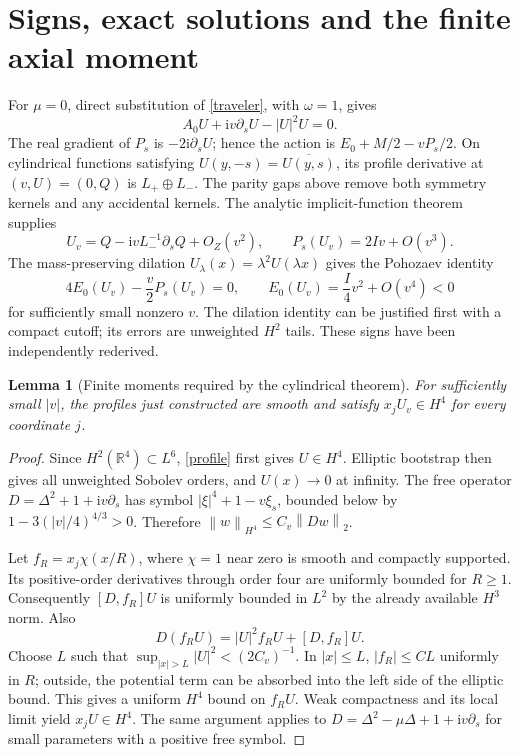 \documentclass[11pt,a4paper]{article}
\newtheorem{lemma}{Lemma}
\newcommand{\R}{\mathbb R}
\newcommand{\ii}{\mathrm i}
\newcommand{\norm}[1]{\left\|#1\right\|}
\begin{document}
\section{Signs, exact solutions and the finite axial moment}
For $\mu=0$, direct substitution of \eqref{traveler}, with $\omega=1$, gives
\begin{equation}\label{profile}
 A_0U+\ii v\partial_sU-|U|^2U=0.
\end{equation}
The real gradient of $P_s$ is $-2\ii\partial_sU$; hence the action is $E_0+M/2-vP_s/2$. On cylindrical functions satisfying $U(y,-s)=\overline{U(y,s)}$, its profile derivative at $(v,U)=(0,Q)$ is $L_+\oplus L_-$. The parity gaps above remove both symmetry kernels and any accidental kernels. The analytic implicit-function theorem supplies
\[
 U_v=Q-\ii v L_-^{-1}\partial_sQ+O_Z(v^2),\qquad
 P_s(U_v)=2Iv+O(v^3).
\]
The mass-preserving dilation $U_\lambda(x)=\lambda^2U(\lambda x)$ gives the Pohozaev identity
\begin{equation}\label{energy}
 4E_0(U_v)-\frac v2P_s(U_v)=0,
 \qquad E_0(U_v)=\frac I4v^2+O(v^4)<0
\end{equation}
for sufficiently small nonzero $v$. The dilation identity can be justified first with a compact cutoff; its errors are unweighted $H^2$ tails. These signs have been independently rederived.

\begin{lemma}[Finite moments required by the cylindrical theorem]
For sufficiently small $|v|$, the profiles just constructed are smooth and satisfy $x_jU_v\in H^4$ for every coordinate $j$.
\end{lemma}
\begin{proof}
Since $H^2(\R^4)\subset L^6$, \eqref{profile} first gives $U\in H^4$. Elliptic bootstrap then gives all unweighted Sobolev orders, and $U(x)\to0$ at infinity. The free operator $D=\Delta^2+1+\ii v\partial_s$ has symbol $|\xi|^4+1-v\xi_s$, bounded below by $1-3(|v|/4)^{4/3}>0$. Therefore $\norm w_{H^4}\le C_v\norm{Dw}_2$.

Let $f_R=x_j\chi(x/R)$, where $\chi=1$ near zero is smooth and compactly supported. Its positive-order derivatives through order four are uniformly bounded for $R\ge1$. Consequently $[D,f_R]U$ is uniformly bounded in $L^2$ by the already available $H^3$ norm. Also
\[
 D(f_RU)=|U|^2f_RU+[D,f_R]U.
\]
Choose $L$ such that $\sup_{|x|>L}|U|^2<(2C_v)^{-1}$. In $|x|\le L$, $|f_R|\le C L$ uniformly in $R$; outside, the potential term can be absorbed into the left side of the elliptic bound. This gives a uniform $H^4$ bound on $f_RU$. Weak compactness and its local limit yield $x_jU\in H^4$. The same argument applies to $D=\Delta^2-\mu\Delta+1+\ii v\partial_s$ for small parameters with a positive free symbol.
\end{proof}
\end{document}
